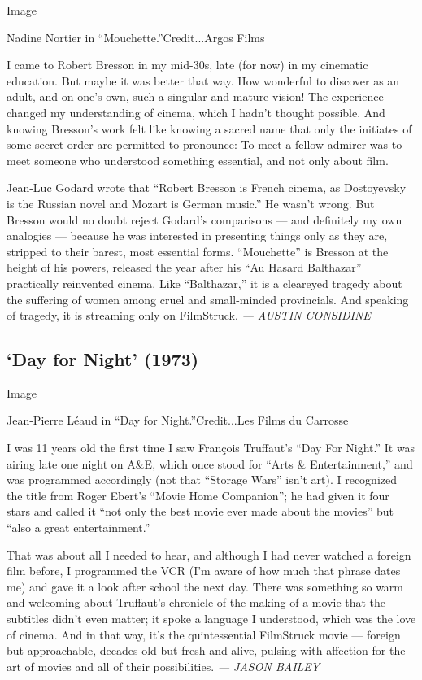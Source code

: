 Image

Nadine Nortier in ``Mouchette.''Credit...Argos Films

I came to Robert Bresson in my mid-30s, late (for now) in my cinematic
education. But maybe it was better that way. How wonderful to discover
as an adult, and on one's own, such a singular and mature vision! The
experience changed my understanding of cinema, which I hadn't thought
possible. And knowing Bresson's work felt like knowing a sacred name
that only the initiates of some secret order are permitted to pronounce:
To meet a fellow admirer was to meet someone who understood something
essential, and not only about film.

Jean-Luc Godard wrote that ``Robert Bresson is French cinema, as
Dostoyevsky is the Russian novel and Mozart is German music.'' He wasn't
wrong. But Bresson would no doubt reject Godard's comparisons --- and
definitely my own analogies --- because he was interested in presenting
things only as they are, stripped to their barest, most essential forms.
``Mouchette'' is Bresson at the height of his powers, released the year
after his ``Au Hasard Balthazar'' practically reinvented cinema. Like
``Balthazar,'' it is a cleareyed tragedy about the suffering of women
among cruel and small-minded provincials. And speaking of tragedy, it is
streaming only on FilmStruck. \emph{--- AUSTIN CONSIDINE}

\hypertarget{day-for-night-1973}{%
\subsection{`Day for Night' (1973)}\label{day-for-night-1973}}

Image

Jean-Pierre Léaud in ``Day for Night.''Credit...Les Films du Carrosse

I was 11 years old the first time I saw François Truffaut's ``Day For
Night.'' It was airing late one night on A\&E, which once stood for
``Arts \& Entertainment,'' and was programmed accordingly (not that
``Storage Wars'' isn't art). I recognized the title from Roger Ebert's
``Movie Home Companion''; he had given it four stars and called it ``not
only the best movie ever made about the movies'' but ``also a great
entertainment.''

That was about all I needed to hear, and although I had never watched a
foreign film before, I programmed the VCR (I'm aware of how much that
phrase dates me) and gave it a look after school the next day. There was
something so warm and welcoming about Truffaut's chronicle of the making
of a movie that the subtitles didn't even matter; it spoke a language I
understood, which was the love of cinema. And in that way, it's the
quintessential FilmStruck movie --- foreign but approachable, decades
old but fresh and alive, pulsing with affection for the art of movies
and all of their possibilities. \emph{--- JASON BAILEY}

